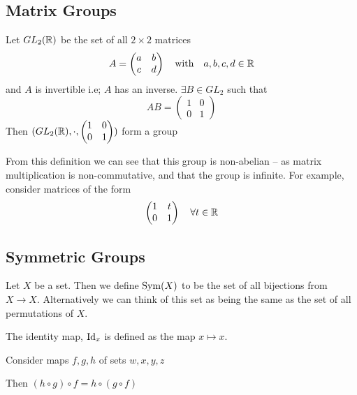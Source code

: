 \documentclass{article}
\begin{document}

\subsection{Matrix Groups}
\begin{defi}
    Let $GL_2(\mathbb{R})$ be the set of all $2 \times 2$ matrices
    \[
        A = \begin{pmatrix}
            a & b \\
            c & d
        \end{pmatrix} \quad \text{with} \quad a,b,c,d \in \mathbb{R}
    \]
    and $A$ is invertible i.e; $A$ has an inverse. $\exists B \in GL_2$ such that
    \[
        AB = \begin{pmatrix}
            1 & 0 \\
            0 & 1
        \end{pmatrix}
    \]
    Then $(GL_2(\mathbb{R}), \cdot, \begin{pmatrix}
        1 & 0 \\
        0 & 1
    \end{pmatrix})$ form a group
\end{defi}

From this definition we can see that this group is non-abelian -- as matrix multiplication is non-commutative, and that the group is infinite. For example, consider matrices of the form
\[
    \begin{pmatrix}
        1 & t \\
        0 & 1
    \end{pmatrix} \quad \forall t \in \mathbb{R}
\]

\subsection{Symmetric Groups}
\begin{defi}[$\Sym(X)$]
    Let $X$ be a set. Then we define $\Sym(X)$ to be the set of all bijections from $X \rightarrow X$. Alternatively we can think of this set as being the same as the set of all permutations of $X$.
\end{defi}

\begin{defi}[$\Id_x$]
    The identity map, $\Id_x$ is defined as the map $x \mapsto x$. 
\end{defi}

\begin{lemma}
    Consider maps $f, g, h$ of sets $w, x, y, z$
    \begin{center}
    \end{center}
    Then $(h \circ g) \circ f = h \circ (g \circ f)$
\end{lemma}
\end{document}
